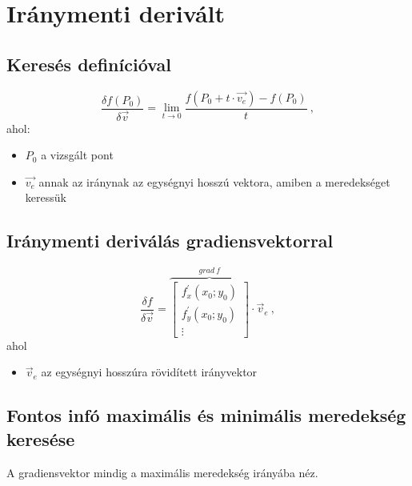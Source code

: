 \documentclass[a4paper,12pt]{article}
\begin{document}
\section{Iránymenti derivált}
\subsection{Keresés definícióval}
\begin{equation}
  \frac{\delta f(P_0)}{\delta \vec{v}} = \lim_{t \rightarrow 0} \frac{f(P_0 + t \cdot \vec{v_e}) - f(P_0)}{t}\ ,
\end{equation}
ahol:
\begin{itemize}
\item $P_0$ a vizsgált pont
\item $\vec{v_e}$ annak az iránynak az egységnyi hosszú vektora, amiben a meredekséget keressük
\end{itemize}
\subsection{Iránymenti deriválás gradiensvektorral}
\begin{equation}
  \frac{\delta f}{\delta \vec{v}} = \overbrace{
    \begin{bmatrix}
      f^{'}_x(x_0;y_0) \\
      f^{'}_y(x_0;y_0) \\
      \vdots
    \end{bmatrix}}^{grad\ f} \cdot \vec{v}_e \ ,
\end{equation}
ahol
\begin{itemize}
\item $\vec{v}_e$ az egységnyi hosszúra rövidített irányvektor
\end{itemize}
\subsection{Fontos infó maximális és minimális meredekség keresése}
A gradiensvektor mindig a maximális meredekség irányába néz.
\end{document}
